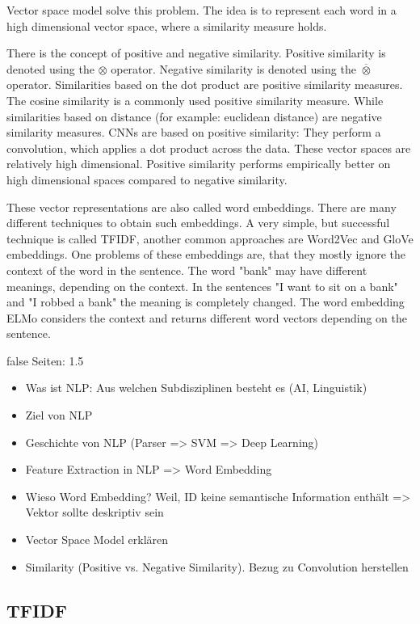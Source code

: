 \documentclass[draft,final,oneside]{vutinfth} %
\begin{document}
Vector space model solve this problem. The idea is to represent each word in a high dimensional vector space, where a similarity measure holds.

There is the concept of positive and negative similarity. Positive similarity is denoted using the $\otimes$ operator. Negative similarity is denoted using the $\overline{\otimes}$ \cite{TUW-233295} operator. Similarities based on the dot product are positive similarity measures. The cosine similarity is a commonly used positive similarity measure. While similarities based on distance (for example: euclidean distance) are negative similarity measures. CNNs are based on positive similarity: They perform a convolution, which applies a dot product across the data. These vector spaces are relatively high dimensional. Positive similarity performs empirically better on high dimensional spaces compared to negative similarity.	

These vector representations are also called word embeddings. There are many different techniques to obtain such embeddings. A very simple, but successful technique is called TFIDF, another common approaches are Word2Vec and GloVe embeddings. One problems of these embeddings are, that they mostly ignore the context of the word in the sentence. The word "bank" may have different meanings, depending on the context. In the sentences "I want to sit on a bank" and "I robbed a bank" the meaning is completely changed. The word embedding ELMo considers the context and returns different word vectors depending on the sentence.

\if false
Seiten: 1.5
\begin{itemize}
\item Was ist NLP: Aus welchen Subdisziplinen besteht es (AI, Linguistik)
\item Ziel von NLP
\item Geschichte von NLP (Parser => SVM => Deep Learning)
\item Feature Extraction in NLP => Word Embedding
\item Wieso Word Embedding? Weil, ID keine semantische Information enthält => Vektor sollte deskriptiv sein
\item Vector Space Model erklären
\item Similarity (Positive vs. Negative Similarity). Bezug zu Convolution herstellen
\end{itemize}

\fi

\subsection{TFIDF}
\end{document}

